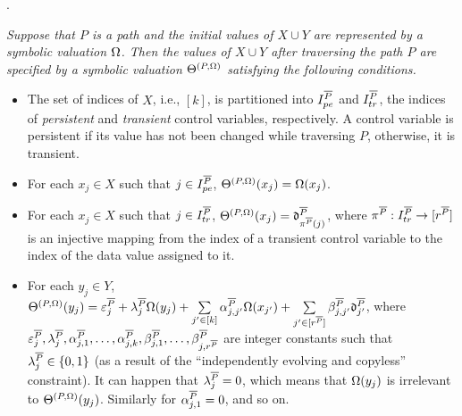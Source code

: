 \begin{appendix}
.
{\it Suppose that $P$ is a path and the initial values of $X \cup Y$ are represented by a symbolic valuation $\Omega$. Then the values of $X \cup Y$ after traversing the path $P$ are specified by a symbolic valuation $\Theta^{(P,\Omega)}$ satisfying the following conditions.
\begin{itemize}
\item The set of indices of $X$, i.e., $[k]$, is partitioned into $I^{\overline{P}}_{pe}$ and $I^{\overline{P}}_{tr}$, the indices of \emph{persistent} and \emph{transient} control variables, respectively. A control variable is persistent if its value has not been changed while traversing $P$, otherwise, it is transient.
\item For each $x_j\in X$ such that $j\in I^{\overline{P}}_{pe}$, $\Theta^{(P,\Omega)}(x_j)=\Omega(x_j)$.
%
\item  For each $x_j\in X$ such that $j\in I^{\overline{P}}_{tr}$,
$\Theta^{(P,\Omega)}(x_j)=\mathfrak{d}^{\overline{P}}_{\pi^{\overline{P}}(j)}$, where $\pi^{\overline{P}}: I^{\overline{P}}_{tr} \rightarrow [r^{\overline{P}}]$ is an injective mapping from the index of a transient control variable to the index of the data value assigned to it.
% 
\item For each $y_j \in Y$, 
$
 \Theta^{(P,\Omega)}(y_j)  =
 \varepsilon^{\overline{P}}_{j} + 
 \lambda^{\overline{P}}_j \Omega(y_j)  + 
  \sum\limits_{j'\in [k]}\alpha^{\overline{P}}_{j,j'}\Omega(x_{j'}) +
  \sum\limits_{j'\in [r^{\overline{P}}]}\beta^{\overline{P}}_{j,j'} \mathfrak{d}^{\overline{P}}_{j'}$,
where $\varepsilon^{\overline{P}}_j,\lambda^{\overline{P}}_j, \alpha^{\overline{P}}_{j,1},\dots,\alpha^{\overline{P}}_{j,k}, \beta^{\overline{P}}_{j,1},\dots,\beta^{\overline{P}}_{j,r^{\overline{P}}}$ are integer constants such that $\lambda^{\overline{P}}_{j} \in \{0,1\}$ (as a result of the ``independently evolving and copyless'' constraint).  It can happen that $\lambda^{\overline{P}}_j =0$,  which means that $\Omega(y_j)$ is irrelevant to $\Theta^{(P,\Omega)}(y_j)$. Similarly for $\alpha^{\overline{P}}_{j,1}=0$, and so on.
\end{itemize}
}


\end{appendix}

